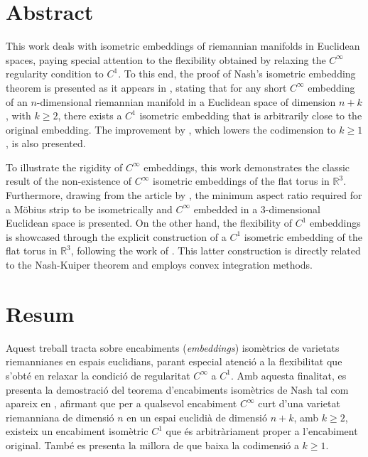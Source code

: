 \documentclass[11pt,a4paper,openright,oneside]{book}
\numberwithin{equation}{section}
\theoremstyle{definition}
\begin{document}
\newpage
{} 

\section*{Abstract}
This work deals with isometric embeddings of riemannian manifolds in Euclidean spaces, paying special attention to the flexibility obtained by relaxing the $C^\infty$ regularity condition to $C^1$. To this end, the proof of Nash's isometric embedding theorem is presented as it appears in \cite{nash1954}, stating that for any short $C^\infty$ embedding of an $n$-dimensional riemannian manifold in a Euclidean space of dimension $n+k$, with $k \geq 2$, there exists a $C^1$ isometric embedding that is arbitrarily close to the original embedding. The improvement by \cite{kuiper1955}, which lowers the codimension to $k \geq 1$, is also presented.

To illustrate the rigidity of $C^\infty$ embeddings, this work demonstrates the classic result of the non-existence of $C^\infty$ isometric embeddings of the flat torus in $\mathbb R^3$. Furthermore, drawing from the article by \cite{schwartz2024}, the minimum aspect ratio required for a Möbius strip to be isometrically and $C^\infty$ embedded in a 3-dimensional Euclidean space is presented. On the other hand, the flexibility of $C^1$ embeddings is showcased through the explicit construction of a $C^1$ isometric embedding of the flat torus in $\mathbb R^3$, following the work of \cite{borrelli2013}. This latter construction is directly related to the Nash-Kuiper theorem and employs convex integration methods.



\section*{Resum}
Aquest treball tracta sobre encabiments (\textit{embeddings}) isomètrics de varietats riemannianes en espais euclidians, parant especial atenció a la flexibilitat que s'obté en relaxar la condició de regularitat $C^\infty$ a $C^1$. Amb aquesta finalitat, es presenta la demostració del teorema d'encabiments isomètrics de Nash tal com apareix en \cite{nash1954}, afirmant que per a qualsevol encabiment $C^\infty$ curt d'una varietat riemanniana de dimensió $n$ en un espai euclidià de dimensió $n+k$, amb $k \geq 2$, existeix un encabiment isomètric $C^1$ que és arbitràriament proper a l'encabiment original. També es presenta la millora de \cite{kuiper1955} que baixa la codimensió a $k\ge1$. 
\end{document}
